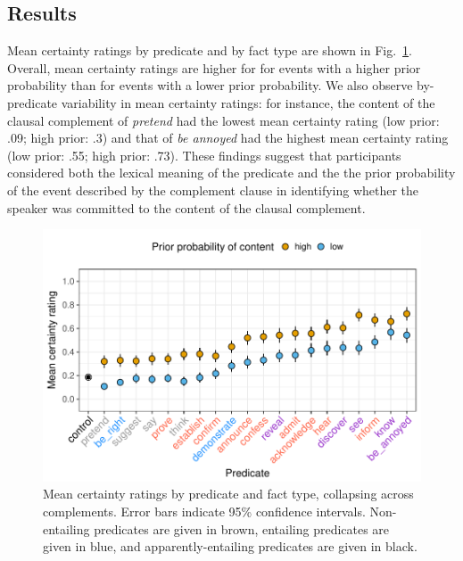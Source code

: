 \documentclass[11pt,fleqn]{article}
\newcommand{\6}{\mbox{$[\hspace*{-.6mm}[$}}
\newcommand{\9}{\mbox{$]\hspace*{-.6mm}]$}}
\begin{document}
\subsection{Results}

Mean certainty ratings by predicate and by fact type are shown in Fig.~\ref{f-projectivity}. Overall, mean certainty ratings are higher for for events with a higher prior probability than for events with a lower prior probability. We also observe by-predicate variability in mean certainty ratings: for instance, the content of the clausal complement of {\em pretend} had the lowest mean certainty rating (low prior: .09; high prior: .3) and that of {\em be annoyed} had the highest mean certainty rating (low prior: .55; high prior: .73). These findings suggest that participants considered both the lexical meaning of the predicate and the the prior probability of the event described by the complement clause in identifying whether the speaker was committed to the content of the clausal complement.

\begin{figure}[h!]
\centering

\includegraphics[width=.8\paperwidth]{../results/3-projectivity/graphs/means-projectivity-by-predicate-and-facttype}

\caption{Mean certainty ratings by predicate and fact type, collapsing across complements. Error bars indicate 95\% confidence intervals. Non-entailing predicates are given in brown, entailing predicates are given in blue, and apparently-entailing predicates are given in black.}
\label{f-projectivity}
\end{figure}
\end{document}
